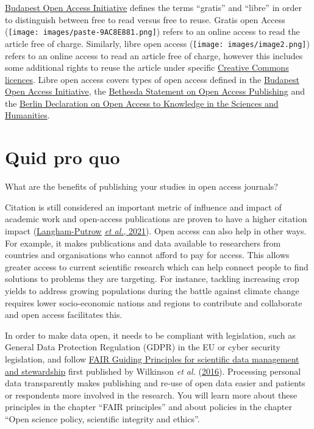 \documentclass[
]{book}
\begin{document}
\href{https://www.budapestopenaccessinitiative.org/}{Budapest Open Access Initiative} defines the terms ``gratis'' and ``libre'' in order to distinguish between free to read versus free to reuse. Gratis open Access (\texttt{[image: images/paste-9AC8E881.png]}) refers to an online access to read the article free of charge. Similarly, libre open access (\texttt{[image: images/image2.png]}) refers to an online access to read an article free of charge, however this includes some additional rights to reuse the article under specific \href{https://en.wikipedia.org/wiki/Creative_Commons_license}{Creative Commons licences}. Libre open access covers types of open access defined in the \href{https://en.wikipedia.org/wiki/Budapest_Open_Access_Initiative}{Budapest Open Access Initiative}, the \href{https://en.wikipedia.org/wiki/Bethesda_Statement_on_Open_Access_Publishing}{Bethesda Statement on Open Access Publishing} and the \href{https://en.wikipedia.org/wiki/Berlin_Declaration_on_Open_Access_to_Knowledge_in_the_Sciences_and_Humanities}{Berlin Declaration on Open Access to Knowledge in the Sciences and Humanities}.

\hypertarget{quid-pro-quo}{%
\section{Quid pro quo}\label{quid-pro-quo}}

What are the benefits of publishing your studies in open access journals?

Citation is still considered an important metric of influence and impact of academic work and open-access publications are proven to have a higher citation impact (\href{https://journals.plos.org/plosone/article?id=10.1371/journal.pone.0253129}{Langham-Putrow} \href{https://journals.plos.org/plosone/article?id=10.1371/journal.pone.0253129}{\emph{et al.}, 2021}). Open access can also help in other ways. For example, it makes publications and data available to researchers from countries and organisations who cannot afford to pay for access. This allows greater access to current scientific research which can help connect people to find solutions to problems they are targeting. For instance, tackling increasing crop yields to address growing populations during the battle against climate change requires lower socio-economic nations and regions to contribute and collaborate and open access facilitates this.

In order to make data open, it needs to be compliant with legislation, such as General Data Protection Regulation (GDPR) in the EU or cyber security legislation, and follow \href{http://www.nature.com/articles/sdata201618}{FAIR Guiding Principles for scientific data management and stewardship} first published by Wilkinson \emph{et al.} (\href{https://www.nature.com/articles/sdata201618}{2016}). Processing personal data transparently makes publishing and re-use of open data easier and patients or respondents more involved in the research. You will learn more about these principles in the chapter ``FAIR principles'' and about policies in the chapter ``Open science policy, scientific integrity and ethics''.
\end{document}
